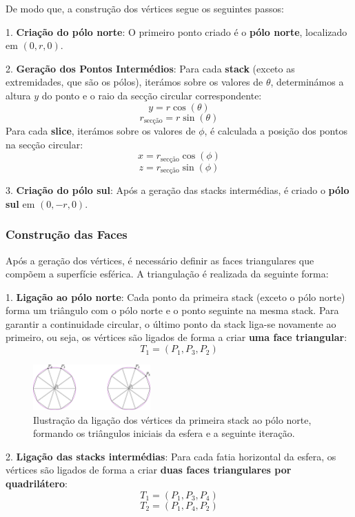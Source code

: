 \documentclass[12pt, a4paper]{article}
\begin{document}
De modo que, a construção dos vértices segue os seguintes passos:

1. \textbf{Criação do pólo norte}: O primeiro ponto criado é o \textbf{pólo norte}, localizado em
\( (0, r, 0) \).

2. \textbf{Geração dos Pontos Intermédios}: Para cada \textbf{stack} (exceto as extremidades, que
são os pólos), iterámos sobre os valores de \( \theta \), determinámos a altura \( y \) do ponto
e o raio da secção circular correspondente:
\[
y = r \cos(\theta)
\]
\[
r_{\text{secção}} = r \sin(\theta)
\]
Para cada \textbf{slice}, iterámos sobre os valores de \( \phi \), é calculada a posição dos pontos
na secção circular:
\[
x = r_{\text{secção}} \cos(\phi)
\]
\[
z = r_{\text{secção}} \sin(\phi)
\]

3. \textbf{Criação do pólo sul}: Após a geração das stacks intermédias, é criado o \textbf{pólo sul}
em \( (0, -r, 0) \).

\subsubsection{Construção das Faces}
Após a geração dos vértices, é necessário definir as faces triangulares que compõem a superfície
esférica. A triangulação é realizada da seguinte forma:

1. \textbf{Ligação ao pólo norte}: Cada ponto da primeira stack (exceto o pólo norte) forma um
triângulo com o pólo norte e o ponto seguinte na mesma stack. Para garantir a continuidade circular,
o último ponto da stack liga-se novamente ao primeiro, ou seja, os vértices são ligados de forma a
criar \textbf{uma face triangular}:
\[
T_1 = (P_1, P_3, P_2)
\]

\begin{figure}[H]
    \centering
    \includegraphics[width=0.4\textwidth]{res/figures/polosSphere.pdf}
    \caption{
        Ilustração da ligação dos vértices da primeira stack ao pólo norte, formando os triângulos
        iniciais da esfera e a seguinte iteração.
    }
\end{figure}

2. \textbf{Ligação das stacks intermédias}:
Para cada fatia horizontal da esfera, os vértices são ligados de forma a criar \textbf{duas faces
triangulares por quadrilátero}:
\[
T_1 = (P_1, P_3, P_4)
\]
\[
T_2 = (P_1, P_4, P_2)
\]
\end{document}
